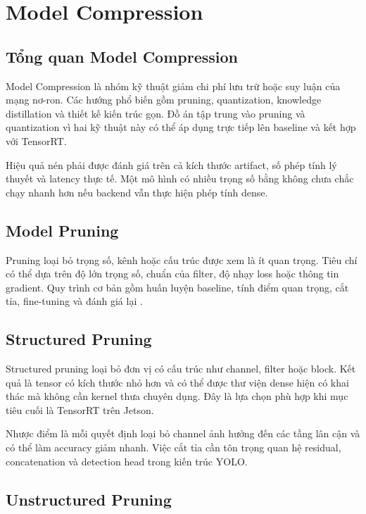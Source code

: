 \section{Model Compression}

\subsection{Tổng quan Model Compression}

Model Compression là nhóm kỹ thuật giảm chi phí lưu trữ hoặc suy luận của mạng
nơ-ron. Các hướng phổ biến gồm pruning, quantization, knowledge distillation và
thiết kế kiến trúc gọn. Đồ án tập trung vào pruning và quantization vì hai kỹ thuật
này có thể áp dụng trực tiếp lên baseline và kết hợp với TensorRT.

Hiệu quả nén phải được đánh giá trên cả kích thước artifact, số phép tính lý
thuyết và latency thực tế. Một mô hình có nhiều trọng số bằng không chưa chắc
chạy nhanh hơn nếu backend vẫn thực hiện phép tính dense.

\subsection{Model Pruning}

Pruning loại bỏ trọng số, kênh hoặc cấu trúc được xem là ít quan trọng. Tiêu chí
có thể dựa trên độ lớn trọng số, chuẩn của filter, độ nhạy loss hoặc thông tin
gradient. Quy trình cơ bản gồm huấn luyện baseline, tính điểm quan trọng, cắt tỉa,
fine-tuning và đánh giá lại \cite{han2016,molchanov2017}.

\subsection{Structured Pruning}

Structured pruning loại bỏ đơn vị có cấu trúc như channel, filter hoặc block.
Kết quả là tensor có kích thước nhỏ hơn và có thể được thư viện dense hiện có
khai thác mà không cần kernel thưa chuyên dụng. Đây là lựa chọn phù hợp khi mục
tiêu cuối là TensorRT trên Jetson.

Nhược điểm là mỗi quyết định loại bỏ channel ảnh hưởng đến các tầng lân cận và
có thể làm accuracy giảm nhanh. Việc cắt tỉa cần tôn trọng quan hệ residual,
concatenation và detection head trong kiến trúc YOLO.

\subsection{Unstructured Pruning}

